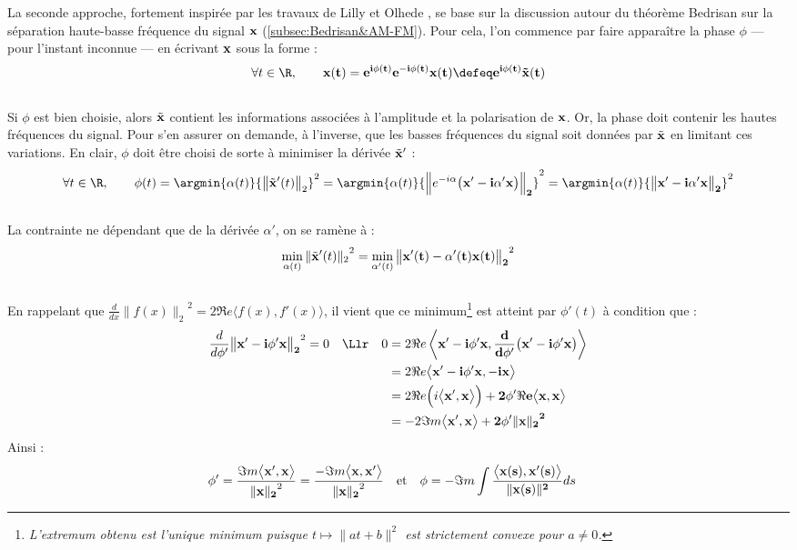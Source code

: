 La seconde approche, fortement inspirée par les travaux de Lilly et Olhede  \cite{lilly_analysis_2012}, se base sur la discussion autour du théorème Bedrisan sur la séparation haute-basse fréquence du signal $\bf{x}$ (\cref{subsec:Bedrisan&AM-FM}). Pour cela, l'on commence par faire apparaître la phase $\phi$ --- pour l'instant inconnue --- en écrivant $\bf{x}$ sous la forme :
\[\forall t\in\R,\qquad \bf{x}(t) = e^{i\phi(t)} e^{-i\phi(t)} \bf{x}(t) \defeq e^{i\phi(t)} \Tilde{\bf{x}}(t)\]
\\
Si $\phi$ est bien choisie, alors $\Tilde{\bf{x}}$ contient les informations associées à l'amplitude et la polarisation de $\bf{x}$. Or, la phase doit contenir les hautes fréquences du signal. 
Pour s'en assurer on demande, à l'inverse, que les basses fréquences du signal soit données par $\Tilde{\bf{x}}$ en limitant ces variations. En clair, $\phi$ doit être choisi de sorte à minimiser la dérivée $\Tilde{\bf{x}}'$ :
\[\forall t\in\R,\qquad \phi(t) = \argmin{\alpha(t)}{\big\|\Tilde{\bf{x}}'(t)\big\|_2}^2 = \argmin{\alpha(t)}{\Big\|e^{-i\alpha}\big(\bf{x}' - i\alpha'\bf{x}\big)\Big\|_2}^2 = \argmin{\alpha(t)}{\big\|\bf{x}' - i\alpha'\bf{x}\big\|_2}^2\]
\\
La contrainte ne dépendant que de la dérivée $\alpha'$, on se ramène à :
\[\min_{\alpha(t)}{\|\Tilde{\bf{x}}'(t)\|_2}^2 = \min_{\alpha'(t)}{\big\|\bf{x}'(t) - \alpha'(t) \bf{x}(t)\big\|_2}^2\]
\\
En rappelant que $\frac{d}{dx}{\big\|f(x)\big\|_2}^2 = 2\Re e\big\langle f(x), f'(x)\big\rangle$, il vient que ce minimum\footnote{\itshape
	L'extremum obtenu est l'unique minimum puisque $t\longmapsto \|at + b\|^2$ est strictement convexe pour $a\neq0$.}
 est atteint par $\phi'(t)$ à condition que :
\begin{align*}
	\frac{d}{d\phi'}{\big\| \bf{x}' - i\phi' \bf{x}\big\|_2}^2 = 0 \quad \Llr\quad
		0 &= 2\Re e\left\langle  \bf{x}' - i\phi' \bf{x} ,  \frac{d}{d\phi'}\big(\bf{x}' - i\phi' \bf{x}\big)\right\rangle \\
		&= 2\Re e\big\langle  \bf{x}' - i\phi' \bf{x} ,  - i \bf{x}\big\rangle \\
		&= 2\Re e\Big(i\big\langle  \bf{x}' ,  \bf{x}\big\rangle\Big) + 2\phi'\Re e\big\langle   \bf{x} ,  \bf{x}\big\rangle\\
		&= -2\Im m\big\langle  \bf{x}' ,  \bf{x}\big\rangle + 2\phi'{\| \bf{x}\|_2}^2
\end{align*}
Ainsi :
\begin{align}\label{eq:phas_inst_v2}
	\phi' &= \frac{\Im m\big\langle  \bf{x}' ,  \bf{x}\big\rangle}{{\| \bf{x}\|_2}^2} = \frac{-\Im m\big\langle  \bf{x},  \bf{x}'\big\rangle}{{\| \bf{x}\|_2}^2}  &  &\text{et}  &  \phi &= -\Im m\int \frac{\big\langle \bf{x}(s) , \bf{x}'(s) \big\rangle}{\|\bf{x}(s)\|^2} ds
\end{align}
